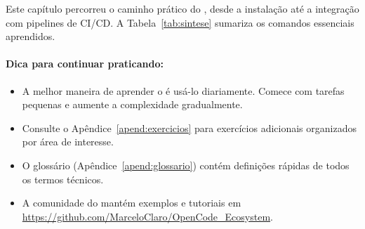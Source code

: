 Este capítulo percorreu o caminho prático do \opencodeeco{}, desde a
instalação até a integração com pipelines de CI/CD. A Tabela~\ref{tab:sintese}
sumariza os comandos essenciais aprendidos.

\begin{table}[htb]
\centering
    \small
\caption{Comandos essenciais do OpenCode Ecosystem}
\label{tab:sintese}
\end{table}

\paragraph{Dica para continuar praticando:}
\begin{itemize}
\item A melhor maneira de aprender o \opencodeeco{} é usá-lo
      diariamente. Comece com tarefas pequenas e aumente a
      complexidade gradualmente.
\item Consulte o Apêndice~\ref{apend:exercicios} para exercícios
      adicionais organizados por área de interesse.
\item O glossário (Apêndice~\ref{apend:glossario}) contém
      definições rápidas de todos os termos técnicos.
\item A comunidade do \opencodeeco{} mantém exemplos e tutoriais em
      \url{https://github.com/MarceloClaro/OpenCode_Ecosystem}.
\end{itemize}
